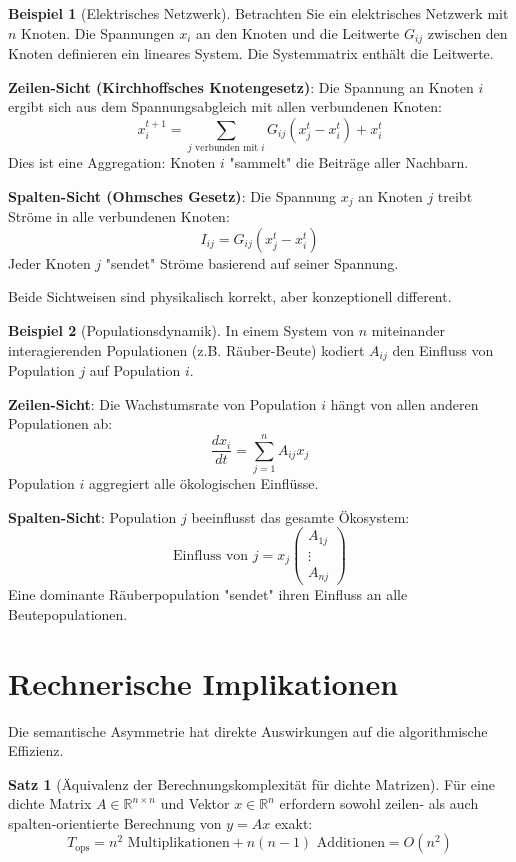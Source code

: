 \documentclass[a4paper,12pt]{report}
\theoremstyle{definition}
\newtheorem{beispiel}{Beispiel}
\newtheorem{satz}{Satz}
\begin{document}
	\begin{beispiel}[Elektrisches Netzwerk]
		Betrachten Sie ein elektrisches Netzwerk mit $n$ Knoten. Die Spannungen $x_i$ an den Knoten und die Leitwerte $G_{ij}$ zwischen den Knoten definieren ein lineares System. Die Systemmatrix enthält die Leitwerte.
		
		\textbf{Zeilen-Sicht (Kirchhoffsches Knotengesetz)}:
		Die Spannung an Knoten $i$ ergibt sich aus dem Spannungsabgleich mit allen verbundenen Knoten:
		\[
		x_i^{t+1} = \sum_{j \text{ verbunden mit } i} G_{ij} (x_j^t - x_i^t) + x_i^t
		\]
		Dies ist eine Aggregation: Knoten $i$ "sammelt" die Beiträge aller Nachbarn.
		
		\textbf{Spalten-Sicht (Ohmsches Gesetz)}:
		Die Spannung $x_j$ an Knoten $j$ treibt Ströme in alle verbundenen Knoten:
		\[
		I_{ij} = G_{ij}(x_j^t - x_i^t)
		\]
		Jeder Knoten $j$ "sendet" Ströme basierend auf seiner Spannung.
		
		Beide Sichtweisen sind physikalisch korrekt, aber konzeptionell different.
	\end{beispiel}
	
	\begin{beispiel}[Populationsdynamik]
		In einem System von $n$ miteinander interagierenden Populationen (z.B. Räuber-Beute) kodiert $A_{ij}$ den Einfluss von Population $j$ auf Population $i$.
		
		\textbf{Zeilen-Sicht}: Die Wachstumsrate von Population $i$ hängt von allen anderen Populationen ab:
		\[
		\frac{dx_i}{dt} = \sum_{j=1}^n A_{ij} x_j
		\]
		Population $i$ aggregiert alle ökologischen Einflüsse.
		
		\textbf{Spalten-Sicht}: Population $j$ beeinflusst das gesamte Ökosystem:
		\[
		\text{Einfluss von } j = x_j \begin{pmatrix} A_{1j} \\ \vdots \\ A_{nj} \end{pmatrix}
		\]
		Eine dominante Räuberpopulation "sendet" ihren Einfluss an alle Beutepopulationen.
	\end{beispiel}
	
	\section{Rechnerische Implikationen}
	
	Die semantische Asymmetrie hat direkte Auswirkungen auf die algorithmische Effizienz.
	
	\begin{satz}[Äquivalenz der Berechnungskomplexität für dichte Matrizen]
		Für eine dichte Matrix $A \in \mathbb{R}^{n \times n}$ und Vektor $x \in \mathbb{R}^n$ erfordern sowohl zeilen- als auch spalten-orientierte Berechnung von $y = Ax$ exakt:
		\[
		T_{\text{ops}} = n^2 \text{ Multiplikationen} + n(n-1) \text{ Additionen} = O(n^2)
		\]
	\end{satz}
	
\end{document}
